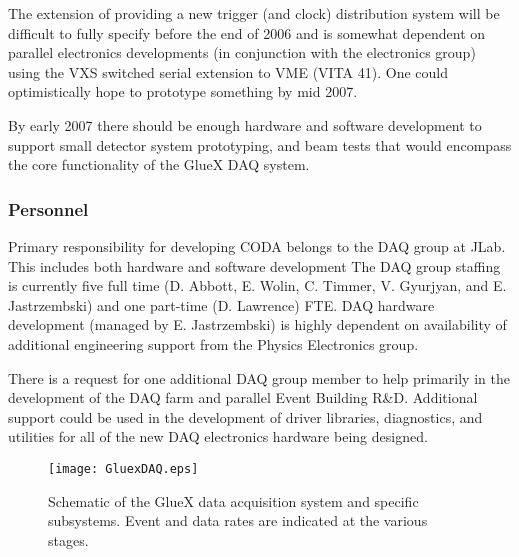 \documentclass[10pt]{article}
\begin{document}
The extension of providing a new trigger (and clock) distribution system 
will be difficult to fully specify before the end of 2006 and is somewhat
dependent on parallel electronics developments (in conjunction with the
electronics group) using the VXS switched serial extension to VME (VITA 41). 
One could optimistically hope to prototype something by mid 2007.

By early 2007 there should be enough hardware and software development to
support small detector system prototyping, and beam tests that would
encompass the core functionality of the GlueX DAQ system. 


\subsubsection*{Personnel}

Primary responsibility for developing CODA belongs to the DAQ group at
JLab.  This includes both hardware and software development The DAQ group
staffing is currently five full time (D. Abbott, E. Wolin, C. Timmer,
V. Gyurjyan, and E. Jastrzembski) and one part-time (D. Lawrence) FTE. DAQ hardware
development (managed by E. Jastrzembski) is highly dependent on
availability of additional engineering support from the Physics Electronics group.

There is a request for one additional DAQ group member to help primarily in the development
of the DAQ farm and parallel Event Building R\&D. Additional support could be used in the
development of driver libraries, diagnostics, and utilities for all of the new DAQ electronics
hardware being designed.



\begin{figure}[p]
\begin{center}
\texttt{[image: GluexDAQ.eps]}
\caption{Schematic of the GlueX data acquisition system and specific
subsystems. Event and data rates are indicated at the various stages.
\label{fig:plan}}
\end{center}
\end{figure}
\end{document}
